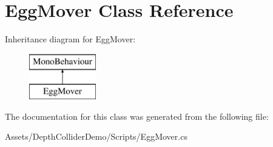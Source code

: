 \hypertarget{class_egg_mover}{}\section{Egg\+Mover Class Reference}
\label{class_egg_mover}
Inheritance diagram for Egg\+Mover\+:\begin{figure}[H]
\begin{center}
\leavevmode
\includegraphics[height=2.000000cm]{class_egg_mover}
\end{center}
\end{figure}


The documentation for this class was generated from the following file\+:\begin{DoxyCompactItemize}
\item 
Assets/\+Depth\+Collider\+Demo/\+Scripts/Egg\+Mover.\+cs\end{DoxyCompactItemize}
